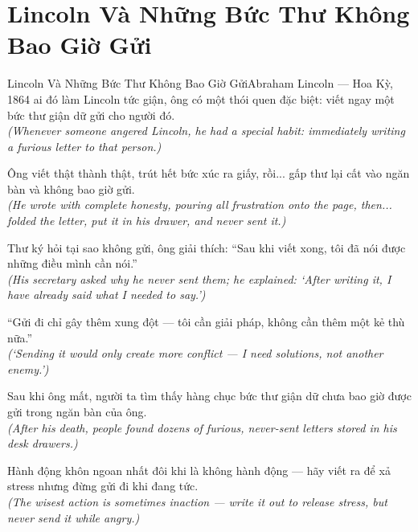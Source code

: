 \section{Lincoln Và Những Bức Thư Không Bao Giờ Gửi}
\begin{truyen}{Lincoln Và Những Bức Thư Không Bao Giờ Gửi}{Abraham Lincoln --- Hoa Kỳ, 1864}
 ai đó làm Lincoln tức giận, ông có một thói quen đặc biệt: viết ngay một bức thư giận dữ gửi cho người đó.\\[4pt]
\textit{(Whenever someone angered Lincoln, he had a special habit: immediately writing a furious letter to that person.)}

Ông viết thật thành thật, trút hết bức xúc ra giấy, rồi... gấp thư lại cất vào ngăn bàn và không bao giờ gửi.\\[4pt]
\textit{(He wrote with complete honesty, pouring all frustration onto the page, then... folded the letter, put it in his drawer, and never sent it.)}

Thư ký hỏi tại sao không gửi, ông giải thích: ``Sau khi viết xong, tôi đã nói được những điều mình cần nói.''\\[4pt]
\textit{(His secretary asked why he never sent them; he explained: `After writing it, I have already said what I needed to say.')}

``Gửi đi chỉ gây thêm xung đột --- tôi cần giải pháp, không cần thêm một kẻ thù nữa.''\\[4pt]
\textit{(`Sending it would only create more conflict --- I need solutions, not another enemy.')}

Sau khi ông mất, người ta tìm thấy hàng chục bức thư giận dữ chưa bao giờ được gửi trong ngăn bàn của ông.\\[4pt]
\textit{(After his death, people found dozens of furious, never-sent letters stored in his desk drawers.)}

\end{truyen}
\begin{baihoc}
  Hành động khôn ngoan nhất đôi khi là không hành động --- hãy viết ra để xả stress nhưng đừng gửi đi khi đang tức.\\[4pt]
  \textit{(The wisest action is sometimes inaction --- write it out to release stress, but never send it while angry.)}
\end{baihoc}


